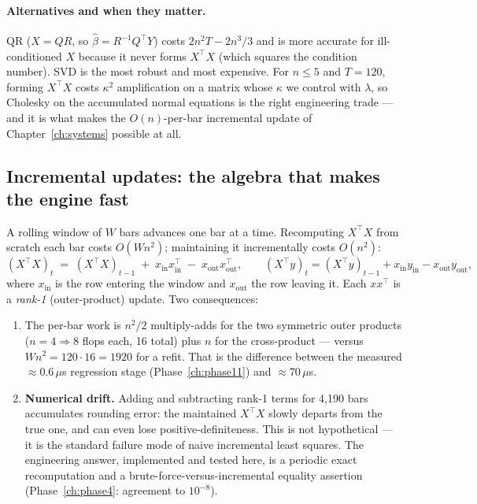 \paragraph{Alternatives and when they matter.} QR ($X=QR$, so $\hat\beta=R^{-1}Q^{\top}Y$)
costs $2n^2T - 2n^3/3$ and is more accurate for ill-conditioned $X$ because it never
forms $X^{\top}X$ (which squares the condition number). SVD is the most robust and most
expensive. For $n\le5$ and $T=120$, forming $X^{\top}X$ costs $\kappa^2$ amplification
on a matrix whose $\kappa$ we control with $\lambda$, so Cholesky on the accumulated
normal equations is the right engineering trade --- and it is what makes the
$O(n)$-per-bar incremental update of Chapter~\ref{ch:systems} possible at all.

\subsection{Incremental updates: the algebra that makes the engine fast}
\label{sec:ols:incremental}

A rolling window of $W$ bars advances one bar at a time. Recomputing $X^{\top}X$ from
scratch each bar costs $O(Wn^2)$; maintaining it incrementally costs $O(n^2)$:
\begin{equation}
  (X^{\top}X)_{t} \;=\; (X^{\top}X)_{t-1} \;+\; x_{\text{in}}x_{\text{in}}^{\top}
  \;-\; x_{\text{out}}x_{\text{out}}^{\top},
  \qquad
  (X^{\top}y)_t = (X^{\top}y)_{t-1} + x_{\text{in}}y_{\text{in}} - x_{\text{out}}y_{\text{out}},
  \label{eq:rank1update}
\end{equation}
where $x_{\text{in}}$ is the row entering the window and $x_{\text{out}}$ the row leaving
it. Each $xx^{\top}$ is a \emph{rank-1} (outer-product) update. Two consequences:

\begin{enumerate}
  \item The per-bar work is $n^2/2$ multiply-adds for the two symmetric outer products
    ($n=4\Rightarrow 8$ flops each, 16 total) plus $n$ for the cross-product --- versus
    $Wn^2 = 120\cdot16=1920$ for a refit. That is the difference between the measured
    $\approx0.6\,\mu$s regression stage (Phase~\ref{ch:phase11}) and $\approx70\,\mu$s.
  \item \textbf{Numerical drift.} Adding and subtracting rank-1 terms for 4{,}190 bars
    accumulates rounding error: the maintained $X^{\top}X$ slowly departs from the true
    one, and can even lose positive-definiteness. This is not hypothetical --- it is the
    standard failure mode of naive incremental least squares. The engineering answer,
    implemented and tested here, is a periodic exact recomputation and a
    brute-force-versus-incremental equality assertion (Phase~\ref{ch:phase4}: agreement
    to $10^{-8}$).
\end{enumerate}

